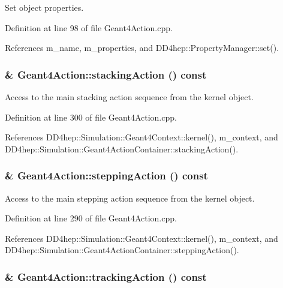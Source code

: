 Set object properties. 

Definition at line 98 of file Geant4Action.cpp.

References m\_\-name, m\_\-properties, and DD4hep::PropertyManager::set().\hypertarget{class_d_d4hep_1_1_simulation_1_1_geant4_action_a6b95f50c5be424298cd711510450c1c4}{
\subsubsection[{stackingAction}]{ \& Geant4Action::stackingAction () const}}
\label{class_d_d4hep_1_1_simulation_1_1_geant4_action_a6b95f50c5be424298cd711510450c1c4}


Access to the main stacking action sequence from the kernel object. 

Definition at line 300 of file Geant4Action.cpp.

References DD4hep::Simulation::Geant4Context::kernel(), m\_\-context, and DD4hep::Simulation::Geant4ActionContainer::stackingAction().\hypertarget{class_d_d4hep_1_1_simulation_1_1_geant4_action_a7dd8d0f77997e948fefb72f0d0a2179e}{
\subsubsection[{steppingAction}]{ \& Geant4Action::steppingAction () const}}
\label{class_d_d4hep_1_1_simulation_1_1_geant4_action_a7dd8d0f77997e948fefb72f0d0a2179e}


Access to the main stepping action sequence from the kernel object. 

Definition at line 290 of file Geant4Action.cpp.

References DD4hep::Simulation::Geant4Context::kernel(), m\_\-context, and DD4hep::Simulation::Geant4ActionContainer::steppingAction().\hypertarget{class_d_d4hep_1_1_simulation_1_1_geant4_action_aa62c971500809db112b2cb4a8732b748}{
\subsubsection[{trackingAction}]{ \& Geant4Action::trackingAction () const}}
\label{class_d_d4hep_1_1_simulation_1_1_geant4_action_aa62c971500809db112b2cb4a8732b748}


